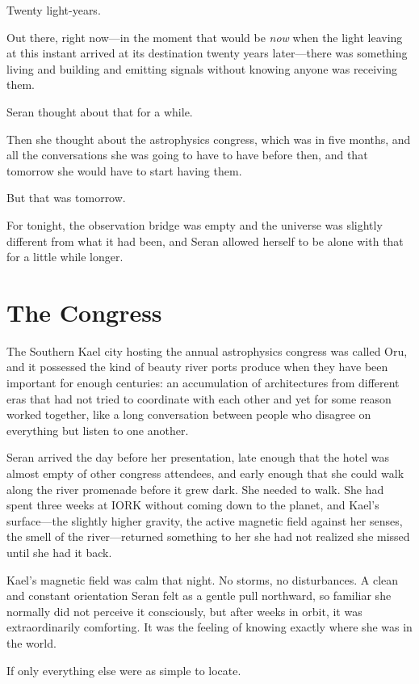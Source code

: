 \documentclass[11pt,a5paper,twoside]{book}
\begin{document}
Twenty light-years.

Out there, right now—in the moment that would be \textit{now} when the light leaving at this instant arrived at its destination twenty years later—there was something living and building and emitting signals without knowing anyone was receiving them.

Seran thought about that for a while.

Then she thought about the astrophysics congress, which was in five months, and all the conversations she was going to have to have before then, and that tomorrow she would have to start having them.

But that was tomorrow.

For tonight, the observation bridge was empty and the universe was slightly different from what it had been, and Seran allowed herself to be alone with that for a little while longer.

\chapter{The Congress}

The Southern Kael city hosting the annual astrophysics congress was called Oru, and it possessed the kind of beauty river ports produce when they have been important for enough centuries: an accumulation of architectures from different eras that had not tried to coordinate with each other and yet for some reason worked together, like a long conversation between people who disagree on everything but listen to one another.

Seran arrived the day before her presentation, late enough that the hotel was almost empty of other congress attendees, and early enough that she could walk along the river promenade before it grew dark. She needed to walk. She had spent three weeks at IORK without coming down to the planet, and Kael's surface—the slightly higher gravity, the active magnetic field against her senses, the smell of the river—returned something to her she had not realized she missed until she had it back.

Kael's magnetic field was calm that night. No storms, no disturbances. A clean and constant orientation Seran felt as a gentle pull northward, so familiar she normally did not perceive it consciously, but after weeks in orbit, it was extraordinarily comforting. It was the feeling of knowing exactly where she was in the world.

If only everything else were as simple to locate.
\end{document}
